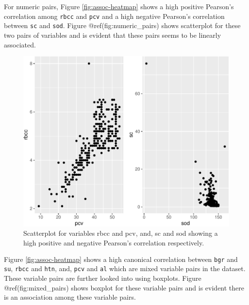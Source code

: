 For numeric pairs, Figure \ref{fig:assoc-heatmap} shows a high positive
Pearson's correlation among \texttt{rbcc} and \texttt{pcv} and a high
negative Pearson's correlation between \texttt{sc} and \texttt{sod}.
Figure @ref(fig:numeric\_pairs) shows scatterplot for these two pairs of
variables and is evident that these pairs seems to be linearly
associated.

\begin{Schunk}
\begin{figure}

{\centering \includegraphics{rj_paper_files/figure-latex/numeric_pairs-1} 

}

\caption[Scatterplot for variables rbcc and pcv, and, sc and sod showing a high positive and negative Pearson's correlation respectively]{Scatterplot for variables rbcc and pcv, and, sc and sod showing a high positive and negative Pearson's correlation respectively.}\label{fig:numeric_pairs}
\end{figure}
\end{Schunk}

Figure \ref{fig:assoc-heatmap} shows a high canonical correlation
between \texttt{bgr} and \texttt{su}, \texttt{rbcc} and \texttt{htn},
and, \texttt{pcv} and \texttt{al} which are mixed variable pairs in the
dataset. These variable pairs are further looked into using boxplots.
Figure @ref(fig:mixed\_pairs) shows boxplot for these variable pairs and
is evident there is an association among these variable pairs.

